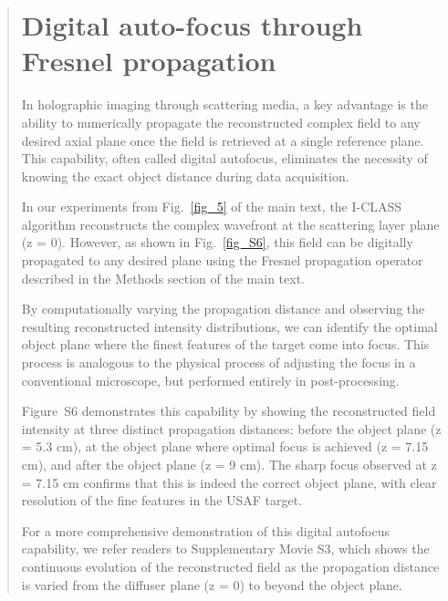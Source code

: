 \documentclass[12pt]{article}
\newenvironment{ourresponse}
    {\begin{tcolorbox}[width=\linewidth,breakable,enhanced,colback=gray!5,colframe=responsecolor!50,title=Response,left=5pt,right=5pt]}
    {\end{tcolorbox}}
\begin{document}
\begin{ourresponse}
\begin{quote}
        \section*{Digital auto-focus through Fresnel propagation}
        
        In holographic imaging through scattering media, a key advantage is the ability to numerically propagate the reconstructed complex field to any desired axial plane once the field is retrieved at a single reference plane. This capability, often called digital autofocus, eliminates the necessity of knowing the exact object distance during data acquisition.
        
        In our experiments from Fig.~\ref{fig_5} of the main text, the I-CLASS algorithm reconstructs the complex wavefront at the scattering layer plane (z = 0). However, as shown in Fig.~\ref{fig_S6}, this field can be digitally propagated to any desired plane using the Fresnel propagation operator described in the Methods section of the main text. 
        
        By computationally varying the propagation distance and observing the resulting reconstructed intensity distributions, we can identify the optimal object plane where the finest features of the target come into focus. This process is analogous to the physical process of adjusting the focus in a conventional microscope, but performed entirely in post-processing.
        
        Figure~S6 demonstrates this capability by showing the reconstructed field intensity at three distinct propagation distances: before the object plane (z = 5.3 cm), at the object plane where optimal focus is achieved (z = 7.15 cm), and after the object plane (z = 9 cm). The sharp focus observed at z = 7.15 cm confirms that this is indeed the correct object plane, with clear resolution of the fine features in the USAF target.
        
        For a more comprehensive demonstration of this digital autofocus capability, we refer readers to Supplementary Movie S3, which shows the continuous evolution of the reconstructed field as the propagation distance is varied from the diffuser plane (z = 0) to beyond the object plane.


\end{quote}
\end{ourresponse}
\end{document}

